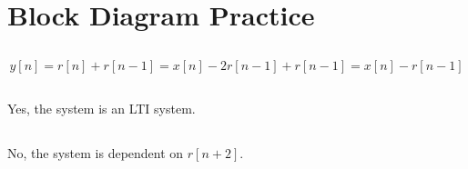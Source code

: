 \documentclass{article}
\begin{document}
\section{Block Diagram Practice}

\subsection{}

\begin{equation}
    y[n] = r[n] + r[n - 1] = x[n] - 2r[n - 1] + r[n - 1] = x[n] - r[n - 1]
\end{equation}

\subsection{}

Yes, the system is an LTI system.

\subsection{}

No, the system is dependent on \(r[n + 2]\).

\subsection{}

\subsection{}

\subsection{}
\end{document}
